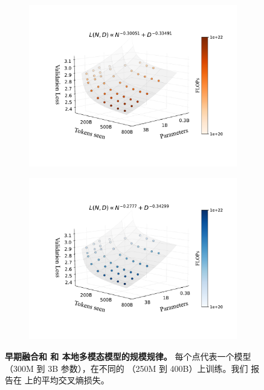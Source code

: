 \begin{figure}[t!]
    \centering
    \captionsetup{type=figure}
    \begin{subfigure}[t]{0.48\linewidth}
        \centering
        \includegraphics[width=1.02\linewidth]{assets/early/3d_scaling_early.pdf}
    \end{subfigure}
    \hfil
    \begin{subfigure}[t]{0.48\linewidth}
        \centering
        \includegraphics[width=1.02\linewidth]{assets/early/3d_scaling_late.pdf}
    \end{subfigure}
    \vspace{5pt}
    \setlength{\fboxsep}{0.5pt}
    \setlength{\fboxrule}{0pt}
    \caption{\textbf{早期融合和  和 
    本地多模态模型的规模规律。} 每个点代表一个模型（300M 到 3B
    参数），在不同的 （250M 到 400B）上训练。我们
    报告在  上的平均交叉熵损失。}
    \label{fig:early_vs_late_scaleflops_3d}
\end{figure}
